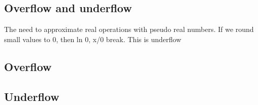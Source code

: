
\subsection{Overflow and underflow}

The need to approximate real operations with pseudo real numbers. If we round small values to 0, then ln 0, x/0 break. This is underflow

\subsection{Overflow}

\subsection{Underflow}


